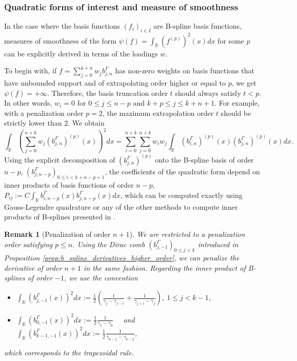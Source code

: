 \documentclass[a4paper]{article}
\newtheorem*{remark}{Remark}
\newcommand{\1}{\textbf{1}}
\newcommand{\R}{\mathbb{R}}
\begin{document}
\subsubsection*{Quadratic forms of interest and measure of smoothness}
\par In the case where the basis functions $(f_i)_{i \in I}$ are B-spline basis functions, measures of smoothness of the form $\psi(f) = \int_\R \left(f^{(p)}\right)^2(x) dx$ for some $p$ can be explicitly derived in terms of the loadings $w$. 
\par To begin with, if $f = \sum\limits_{j = 0}^{k + n} w_j b^{\Gamma}_{j, n}$ has non-zero weights on basis functions that have unbounded support and of extrapolating order higher or equal to $p$, we get $\psi(f) = +\infty$. Therefore, the basis truncation order $t$ should always satisfy $t < p$. In other words, $w_i = 0$ for $0 \leq j \leq n - p$ and $k + p \leq j \leq k + n + 1$. For example, with a penalization order $p=2$, the maximum extrapolation order $t$ should be strictly lower than $2$. We obtain
$$
\int_\R \left(\sum\limits_{j = 0}^{n + k} w_j \left(b^{\Gamma}_{j, n}\right)^{(p)}(x) \right)^2 dx = \sum\limits_{i = 0}^{n + k} \sum\limits_{j = 0}^{n + k} w_i w_j \int_\R \left(b^{\Gamma}_{i, n}\right)^{(p)} (x) \left(b^{\Gamma}_{j, n}\right)^{(p)} (x) dx.
$$
Using the explicit decomposition of $\left(b^{\Gamma}_{j, n}\right)^{(p)}$ onto the B-spline basis of order $n-p$, $\left(b^{\Gamma}_{j, n-p}\right)_{0 \leq i < k + n - p + 1}$, the coefficients of the quadratic form depend on inner products of basis functions of order $n-p$, $P_{ij}:= C \int_\R b^{\Gamma}_{i, n-p} (x) b^{\Gamma}_{j, n-p} (x) dx$, which can be computed exactly using Gauss-Legendre quadrature or any of the other methods to compute inner products of B-splines presented in \cite{VermeulentBartelsHeppler}.
\begin{remark}[Penalization of order $n+1$]
\par We are restricted to a penalization order satisfying $p \leq n$. Using the Dirac comb $\left(b^\Gamma_{j,-1}\right)_{0 \leq j < k}$ introduced in Proposition \ref{prop:b_spline_derivatives_higher_order}, we can penalize the derivative of order $n+1$ in the same fashion. Regarding the inner product of B-splines of order $-1$, we use the convention
\begin{itemize}
\item $\int_\R (b^\Gamma_{j,-1} (x))^2 dx := \frac{1}{2}\left(\frac{1}{\gamma_j - \gamma_{j - 1}} + \frac{1}{\gamma_{j+1} - \gamma_j}\right)$, $1 \leq j < k-1$, 
\item $\int_\R (b^\Gamma_{0,-1} (x))^2 dx := \frac{1}{2}\frac{1}{\gamma_1 - \gamma_{0}}$ \ \ and \ \ $\int_\R (b^\Gamma_{k-1,-1} (x))^2 dx := \frac{1}{2}\frac{1}{\gamma_{k-1} - \gamma_{k-2}}$,
\end{itemize}
which corresponds to the trapezoidal rule. 
\end{remark}
\end{document}
